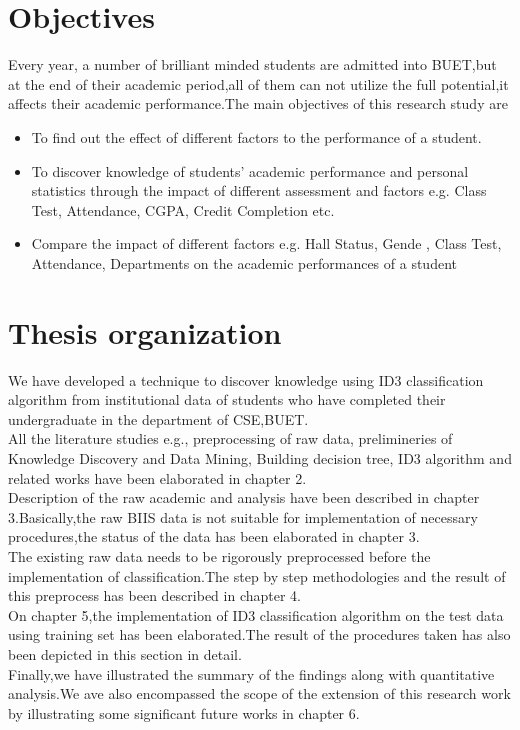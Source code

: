 \section{Objectives}
Every year, a number of brilliant minded students are admitted into BUET,but at the end of their academic period,all of them can not utilize the full potential,it affects their academic performance.The main objectives of this research study are
\begin{itemize}
\item To find out the effect of different factors to the performance of a student.
\item To discover knowledge of students’ academic performance and personal 
statistics through the impact of different assessment and factors e.g. Class 
Test, Attendance, CGPA, Credit Completion etc.
\item Compare the impact of different factors e.g. Hall Status, Gende , Class 
Test, Attendance, Departments on the academic performances of a 
student
\end{itemize}
 
\section{Thesis organization}
We have developed a technique to discover knowledge using ID3 classification algorithm from institutional data of students who have completed their undergraduate in the department of CSE,BUET.\\All the literature studies e.g., preprocessing of raw data, prelimineries of Knowledge Discovery and Data Mining, Building decision tree, ID3 algorithm and related works have been elaborated in chapter 2.\\Description of the raw academic and analysis have been described in chapter 3.Basically,the raw BIIS data is not suitable for implementation of necessary procedures,the status of the data has been elaborated in chapter 3.\\
The existing raw data needs to be rigorously preprocessed before the implementation of classification.The step by step methodologies and the result of this preprocess has been described in chapter 4.\\
On chapter 5,the implementation of ID3 classification algorithm on the test data using training set has been elaborated.The result of the procedures taken has also been depicted in this section in detail.\\Finally,we have illustrated the summary of the findings along with quantitative analysis.We ave also encompassed the scope of the extension of this research work by illustrating some significant future works in chapter 6.  




